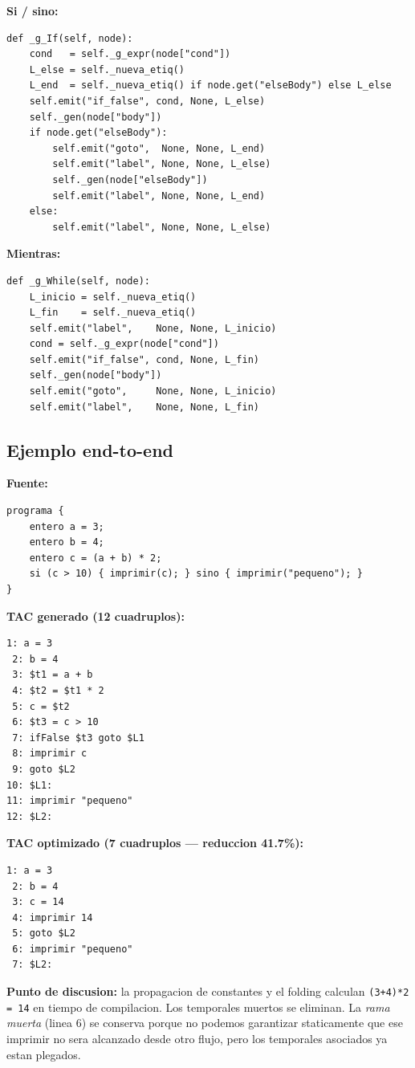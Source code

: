 \documentclass[11pt,a4paper]{article}
\begin{document}
\textbf{Si / sino:}
\begin{lstlisting}[style=py]
def _g_If(self, node):
    cond   = self._g_expr(node["cond"])
    L_else = self._nueva_etiq()
    L_end  = self._nueva_etiq() if node.get("elseBody") else L_else
    self.emit("if_false", cond, None, L_else)
    self._gen(node["body"])
    if node.get("elseBody"):
        self.emit("goto",  None, None, L_end)
        self.emit("label", None, None, L_else)
        self._gen(node["elseBody"])
        self.emit("label", None, None, L_end)
    else:
        self.emit("label", None, None, L_else)
\end{lstlisting}

\textbf{Mientras:}
\begin{lstlisting}[style=py]
def _g_While(self, node):
    L_inicio = self._nueva_etiq()
    L_fin    = self._nueva_etiq()
    self.emit("label",    None, None, L_inicio)
    cond = self._g_expr(node["cond"])
    self.emit("if_false", cond, None, L_fin)
    self._gen(node["body"])
    self.emit("goto",     None, None, L_inicio)
    self.emit("label",    None, None, L_fin)
\end{lstlisting}

\subsection{Ejemplo end-to-end}

\textbf{Fuente:}
\begin{lstlisting}[style=ml]
programa {
    entero a = 3;
    entero b = 4;
    entero c = (a + b) * 2;
    si (c > 10) { imprimir(c); } sino { imprimir("pequeno"); }
}
\end{lstlisting}

\textbf{TAC generado (12 cuadruplos):}
\begin{lstlisting}[style=tac]
 1: a = 3
 2: b = 4
 3: $t1 = a + b
 4: $t2 = $t1 * 2
 5: c = $t2
 6: $t3 = c > 10
 7: ifFalse $t3 goto $L1
 8: imprimir c
 9: goto $L2
10: $L1:
11: imprimir "pequeno"
12: $L2:
\end{lstlisting}

\textbf{TAC optimizado (7 cuadruplos --- reduccion 41.7\%):}
\begin{lstlisting}[style=tac]
 1: a = 3
 2: b = 4
 3: c = 14
 4: imprimir 14
 5: goto $L2
 6: imprimir "pequeno"
 7: $L2:
\end{lstlisting}

\textbf{Punto de discusion:} la propagacion de constantes y el folding
calculan \texttt{(3+4)*2 = 14} en tiempo de compilacion. Los temporales
muertos se eliminan. La \emph{rama muerta} (linea 6) se conserva porque
no podemos garantizar staticamente que ese imprimir no sera alcanzado
desde otro flujo, pero los temporales asociados ya estan plegados.
\end{document}

